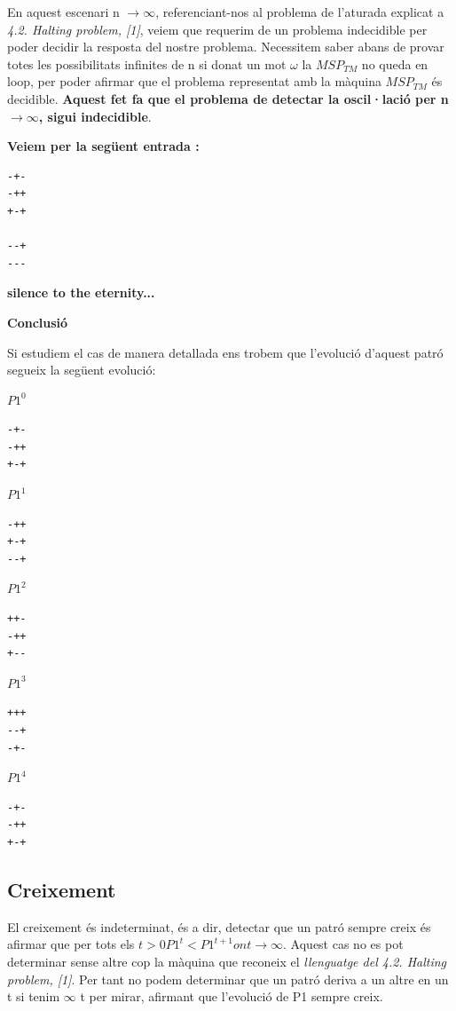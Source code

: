\documentclass[12pt,a4paper]{report}
\def \w{$\omega$}
\def \tm{$MSP_{TM} $}
\begin{document}
En aquest escenari n $\rightarrow \infty$, referenciant-nos al problema de l’aturada explicat a \textit{4.2. Halting problem, [1]}, veiem que requerim de un problema indecidible per poder decidir la resposta del nostre problema. Necessitem saber abans de provar totes les possibilitats infinites de n si donat un mot \w{} la \tm{} no queda en loop, per poder afirmar que el problema representat amb la màquina \tm{} és decidible. \textbf{Aquest fet fa que el problema de detectar la oscil·lació per n $\rightarrow \infty$,  sigui indecidible}.

\textbf{Veiem per la següent entrada :}

\begin{lstlisting}
-+-
-++
+-+

--+
---
\end{lstlisting}

\textbf{silence to the eternity...}

\textbf{Conclusió}

Si estudiem el cas de manera detallada ens trobem que l'evolució d'aquest patró segueix la següent evolució: 


$P1^0$
\begin{lstlisting}
-+-
-++
+-+
\end{lstlisting}

$P1^1$
\begin{lstlisting}
-++
+-+
--+
\end{lstlisting}

$P1^2$
\begin{lstlisting}
++-
-++
+--
\end{lstlisting}

$P1^3$
\begin{lstlisting}
+++
--+
-+-
\end{lstlisting}

$P1^4$
\begin{lstlisting}
-+-
-++
+-+
\end{lstlisting}


\subsection{Creixement}

El creixement és indeterminat, és a dir, detectar que un patró sempre creix és afirmar que per tots els $t > 0 P1^t < P1^{t+1} on t \rightarrow \infty$. Aquest cas no es pot determinar sense altre cop la màquina que reconeix el \textit{llenguatge del 4.2. Halting problem, [1]}. Per tant no podem determinar que un patró deriva a un altre en un t si tenim $\infty$ t per mirar, afirmant que l’evolució de P1 sempre creix.
\end{document}
